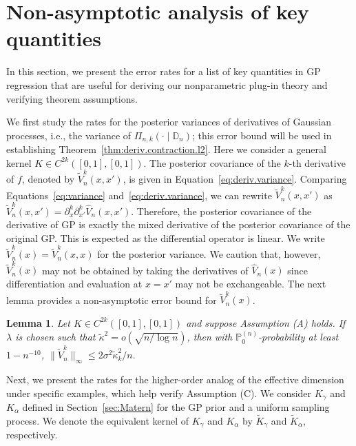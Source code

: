 \documentclass[12pt]{article}
\newcommand\data{\mathbb{D}_n}
\newcommand{\PP}{\mathbb{P}}
\theoremstyle{plain}
\newtheorem{lemma}[theorem]{Lemma}
\theoremstyle{nonitalicremark}
\begin{document}
\section{Non-asymptotic analysis of key quantities}
\label{sec:non-asymptotic}
In this section, we present the error rates for a list of key quantities in GP regression that are useful for deriving our nonparametric plug-in theory and verifying theorem assumptions. 


We first study the rates for the posterior variances of derivatives of Gaussian processes, i.e., the variance of $\Pi_{n,k}(\cdot\mid\data)$; this error bound will be used in establishing Theorem~\ref{thm:deriv.contraction.l2}. Here we consider a general kernel $K\in C^{2k}([0,1],[0,1])$. The posterior covariance of the $k$-th derivative of $f$, denoted by $\tilde{V}^k_n(x, x')$, is given in Equation~\eqref{eq:deriv.variance}. Comparing Equations~\eqref{eq:variance} and~\eqref{eq:deriv.variance}, we can rewrite $\tilde{V}^k_n(x, x')$ as 
$
\tilde{V}^k_n(x, x') = \partial^k_{x}\partial^k_{x'}\hat{V}_n(x,x').
$
Therefore, the posterior covariance of the derivative of GP is exactly the mixed derivative of the posterior covariance of the original GP. This is expected as the differential operator is linear. We write $\tilde{V}^{k}_n(x)=\tilde{V}^k_n(x,x)$ for the posterior variance. We caution that, however, $\tilde{V}^{k}_n(x)$ may not be obtained by taking the derivatives of $\hat{V}_n(x)$ since differentiation and evaluation at $x=x'$ may not be exchangeable. The next lemma provides a non-asymptotic error bound for $\tilde{V}^{k}_n(x)$.

\begin{lemma}\label{thm:equivalent.sigma.deriv}
Let $K\in C^{2k}([0,1],[0,1])$ and suppose Assumption (A) holds. If $\lambda$ is chosen such that $\tilde{\kappa}^2=o(\sqrt{n/\log n})$, then with $\PP_0^{(n)}$-probability at least $1 - n^{-10}$, 
$\|\tilde{V}^{k}_{n}\|_\infty \leq {2\sigma^2\tilde{\kappa}_{k}^2}/{n}.$
\end{lemma}

Next, we present the rates for the higher-order analog of the effective dimension under specific examples, which help verify Assumption (C). We consider $K_\gamma$ and $K_\alpha$ defined in Section~\ref{sec:Matern} for the GP prior and a uniform sampling process. We denote the equivalent kernel of $K_\gamma$ and $K_\alpha$ by $\tilde K_\gamma$ and $\tilde K_\alpha$, respectively.
\end{document}
